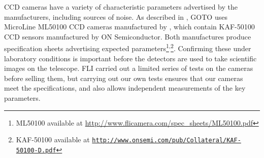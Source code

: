 \begin{colsection}

CCD cameras have a variety of characteristic parameters advertised by the manufacturers, including sources of noise. As described in , GOTO uses MicroLine ML50100 CCD cameras manufactured by , which contain KAF-50100 CCD sensors manufactured by ON Semiconductor. Both manufactures produce specification sheets advertising expected parameters\footnote{ML50100 available at \url{http://www.flicamera.com/spec_sheets/ML50100.pdf}}\textsuperscript{,}\footnote{KAF-50100 available at \href{http://www.onsemi.com/pub/Collateral/KAF-50100-D.PDF}{\texttt{http://www.onsemi.com/pub/Collateral/KAF-50100-D.pdf}}}. Confirming these under laboratory conditions is important before the detectors are used to take scientific images on the telescope. FLI carried out a limited series of tests on the cameras before selling them, but carrying out our own tests ensures that our cameras meet the specifications, and also allows independent measurements of the key parameters.

\end{colsection}


